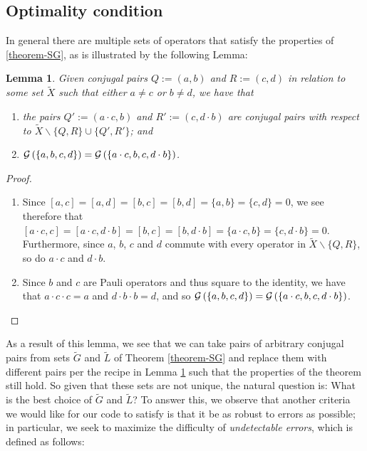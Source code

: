 \documentclass[twocolumn,showpacs,preprintnumbers,amsmath,amssymb,nofootinbib,pra,floatfix]{revtex4-1}
\newtheorem{lemma}{Lemma}
\newcommand{\set}{\tilde}
\newcommand{\genfun}{\mathcal{G}}
\begin{document}
\subsection{Optimality condition}

\label{optimal-generators}

In general there are multiple sets of operators that satisfy the properties of \ref{theorem-SG}, as is illustrated by the following Lemma:

\begin{lemma}
\label{combining-pairs}
Given conjugal pairs $Q:=(a,b)$ and $R:=(c,d)$ in relation to some set $\set X$ such that either $a\ne c$ or $b\ne d$, we have that
\begin{enumerate}
\item the pairs $Q':=(a\cdot c,b)$ and $R':=(c,d\cdot b)$ are conjugal pairs with respect to $\set X \backslash \{Q,R\} \cup \{Q',R'\}$; and
\item $\genfun\paren{\{a,b,c,d\}}=\genfun\paren{\{a\cdot c,b,c,d\cdot b\}}$.
\end{enumerate}
\end{lemma}

\begin{proof}
\begin{enumerate}
\item Since $[a,c]=[a,d]=[b,c]=[b,d]=\{a,b\}=\{c,d\}=0$, we see therefore that $[a\cdot c,c]=[a\cdot c,d\cdot b]=[b,c]=[b,d\cdot b]=\{a\cdot c,b\}=\{c,d\cdot b\}=0$.  Furthermore, since $a$, $b$, $c$ and $d$ commute with every operator in $\set X\backslash \{Q,R\}$, so do $a\cdot c$ and $d\cdot b$.
\item Since $b$ and $c$ are Pauli operators and thus square to the identity, we have that $a\cdot c\cdot c=a$ and $d\cdot b\cdot b=d$, and so $\genfun\paren{\{a,b,c,d\}}=\genfun\paren{\{a\cdot c,b,c,d\cdot b\}}$.
\end{enumerate}
\end{proof}
As a result of this lemma, we see that we can take pairs of arbitrary conjugal pairs from sets $\set G$ and $\set L$ of Theorem \ref{theorem-SG} and replace them with different pairs per the recipe in Lemma \ref{combining-pairs} such that the properties of the theorem still hold.  So given that these sets are not unique, the natural question is:  What is the best choice of $\set G$ and $\set L$?  To answer this, we observe that another criteria we would like for our code to satisfy is that it be as robust to errors as possible;  in particular, we seek to maximize the difficulty of \emph{undetectable errors}, which is defined as follows:
\end{document}
